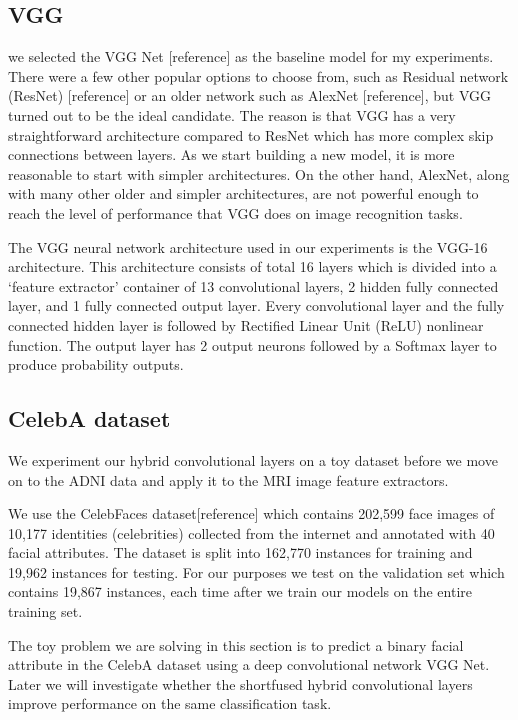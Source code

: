 \documentclass[12pt]{article}
\begin{document}
\subsection{VGG}
we selected the VGG Net [reference] as the baseline model for my experiments. There were a few other popular options to choose from, such as Residual network (ResNet) [reference] or an older network such as AlexNet [reference], but VGG turned out to be the ideal candidate. The reason is that VGG has a very straightforward architecture compared to ResNet which has more complex skip connections between layers. As we start building a new model, it is more reasonable to start with simpler architectures. On the other hand, AlexNet, along with many other older and simpler architectures, are not powerful enough to reach the level of performance that VGG does on image recognition tasks. 

The VGG neural network architecture used in our experiments is the VGG-16 architecture. This architecture consists of total 16 layers which is divided into a `feature extractor' container of 13 convolutional layers, 2 hidden fully connected layer, and 1 fully connected output layer. Every convolutional layer and
the fully connected hidden layer is followed by Rectified Linear Unit (ReLU) nonlinear function. The output layer has 2 output neurons followed by a Softmax layer to produce probability outputs.

\subsection{CelebA dataset}

We experiment our hybrid convolutional layers on a toy dataset before we move on to the ADNI data and apply it to the MRI image feature extractors.

We use the CelebFaces dataset[reference] which contains 202,599 face
images of 10,177 identities (celebrities) collected from
the internet and annotated with 40 facial attributes. The dataset is split into 162,770 instances for training and 19,962 instances for testing. For our purposes we test on the validation set which contains 19,867 instances, each time after we train our models on the entire training set. 

The toy problem we are solving in this section is to predict a binary facial attribute in the CelebA dataset using a deep convolutional network VGG Net. Later we will investigate whether the shortfused hybrid convolutional layers improve performance on the same classification task.
\end{document}
